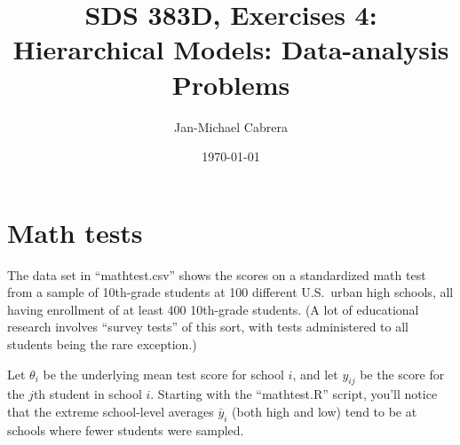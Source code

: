 \documentclass[10pt]{article}
\begin{document}
    \title{SDS 383D, Exercises 4: Hierarchical Models: Data-analysis Problems}
    \author{Jan-Michael Cabrera}
    \date{\today}
    \maketitle

    \section*{Math tests}

    The data set in ``mathtest.csv'' shows the scores on a standardized math test from a sample of 10th-grade students at 100 different U.S.~urban high schools, all having enrollment of at least 400 10th-grade students.  (A lot of educational research involves ``survey tests'' of this sort, with tests administered to all students being the rare exception.)

    Let $\theta_i$ be the underlying mean test score for school $i$, and let $y_{ij}$ be the score for the $j$th student in school $i$.  Starting with the ``mathtest.R'' script, you'll notice that the extreme school-level averages $\bar{y}_i$ (both high and low) tend to be at schools where fewer students were sampled.
\end{document}
